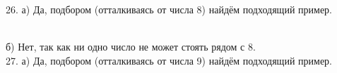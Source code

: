 \documentclass[12pt]{article}
\begin{document}
26. а) Да, подбором (отталкиваясь от числа 8) найдём подходящий пример.
\begin{figure}[ht!]
\end{figure}\\
б) Нет, так как ни одно число не может стоять рядом с 8.\\
27. а) Да, подбором (отталкиваясь от числа 9) найдём подходящий пример.
\begin{figure}[ht!]
\end{figure}\\
\end{document}
